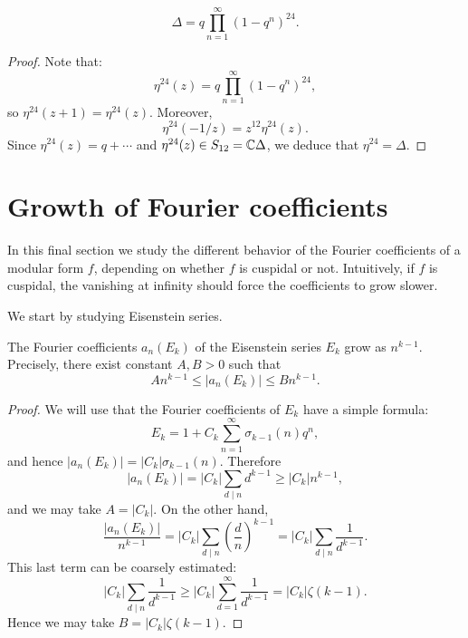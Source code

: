 \begin{theorem}
  \[
\Delta = q\prod_{n=1}^\infty (1-q^n)^{24}.
\]
\end{theorem}
\begin{proof}
  Note that:\[
\eta^{24}(z)=q\prod_{n=1}^\infty (1-q^n)^{24},
\]
so $\eta^{24}(z+1)=\eta^{24}(z)$. Moreover,
\[
\eta^{24}(-1/z) = z^{12}\eta^{24}(z).
\]
Since $\eta^{24}(z)=q+\cdots$ and $\eta^{24}(z)\in S_{12} = \mathbb{C}\Delta$, we deduce that $\eta^{24}=\Delta$.
\end{proof}

\section{Growth of Fourier coefficients}
In this final section we study the different behavior of the Fourier coefficients of a modular form $f$, depending on whether $f$ is cuspidal or not. Intuitively, if $f$ is cuspidal, the vanishing at infinity should force the coefficients to grow slower.

We start by studying Eisenstein series.
\begin{proposition}
\label{prop:growtheistenstein}
  The Fourier coefficients $a_n(E_k)$ of the Eisenstein series $E_k$ grow as $n^{k-1}$. Precisely, there exist constant $A,B>0$ such that
\[
An^{k-1}\leq |a_n(E_k)|\leq B n^{k-1}.
\]
\end{proposition}
\begin{proof}
  We will use that the Fourier coefficients of $E_k$ have a simple formula:
\[
E_k = 1+C_k\sum_{n=1}^\infty \sigma_{k-1}(n)q^n,
\]
and hence $|a_n(E_k)|=|C_k|\sigma_{k-1}(n)$.
Therefore
\[
|a_n(E_k)|=|C_k|\sum_{d\mid n} d^{k-1} \geq |C_k|n^{k-1},
\]
and we may take $A=|C_k|$. On the other hand,
\[
\frac{|a_n(E_k)|}{n^{k-1}} = |C_k|\sum_{d\mid n} \left(\frac{d}{n}\right)^{k-1} = |C_k|\sum_{d\mid n} \frac{1}{d^{k-1}}.
\]
This last term can be coarsely estimated:
\[
|C_k|\sum_{d\mid n} \frac{1}{d^{k-1}}\geq |C_k|\sum_{d=1}^\infty \frac{1}{d^{k-1}} = |C_k|\zeta(k-1).
\]
Hence we may take $B=|C_k|\zeta(k-1)$.
\end{proof}

